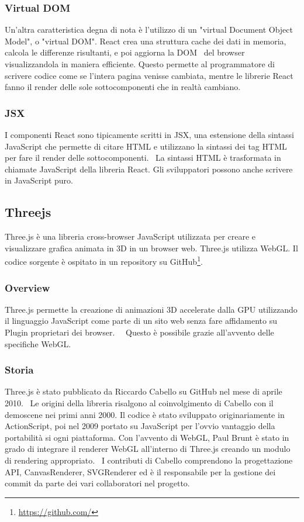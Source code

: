\subsubsection{Virtual DOM}
Un'altra caratteristica degna di nota è l'utilizzo di un "virtual Document Object Model", o "virtual DOM".
React crea una struttura cache dei dati in memoria, calcola le differenze risultanti, e poi aggiorna
la DOM~\cite{reactdom} del browser visualizzandola in maniera efficiente.
Questo permette al programmatore di scrivere codice come se
l'intera pagina venisse cambiata, mentre le librerie React fanno il render delle sole sottocomponenti che in realtà cambiano.

\subsubsection{JSX}
I componenti React sono tipicamente scritti in JSX, una estensione della sintassi JavaScript che permette di citare
HTML e utilizzano la sintassi dei tag HTML per fare  il render delle sottocomponenti.~\cite{jsx}
La sintassi HTML è trasformata in chiamate JavaScript
della libreria React. Gli sviluppatori possono anche scrivere in JavaScript puro.


\newpage
\subsection{Threejs}
\label{sec:chapter_2_section_3_sub_2}
Three.js \`e una libreria cross-browser JavaScript utilizzata per creare e visualizzare grafica animata in 3D
in un browser web. Three.js utilizza WebGL. Il codice sorgente è ospitato in un repository su GitHub\footnote{\url{https://github.com/}}.

\subsubsection{Overview}
Three.js permette la creazione di animazioni 3D accelerate dalla GPU utilizzando il linguaggio JavaScript
come parte di un sito web senza fare affidamento su Plugin proprietari dei browser.~\cite{O3D}~\cite{unity}
 Questo è possibile grazie all'avvento delle specifiche WebGL.~\cite{khronos}

\subsubsection{Storia}
Three.js è stato pubblicato da Riccardo Cabello su GitHub nel mese di aprile 2010.~\cite{Firstcommit}
Le origini della libreria risalgono al coinvolgimento di Cabello con il demoscene nei primi anni 2000.
Il codice \`e stato sviluppato originariamente in ActionScript, poi nel 2009 portato su JavaScript per l'ovvio vantaggio della
portabilità si ogni piattaforma. Con l'avvento di WebGL, Paul Brunt è stato in grado di integrare il renderer
WebGL all'interno di Three.js creando un modulo di rendering appropriato.~\cite{develop}
I contributi di Cabello comprendono la progettazione API, CanvasRenderer, SVGRenderer ed è il
responsabile per la gestione dei commit da parte dei vari collaboratori nel progetto.

